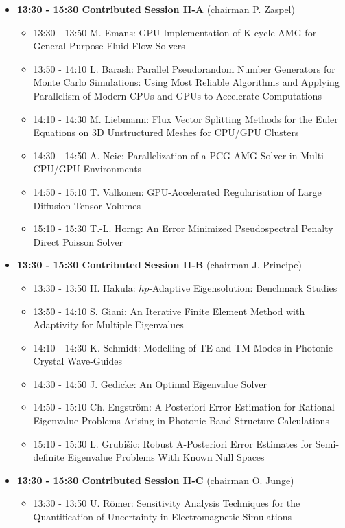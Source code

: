 \documentclass[10pt, A4]{article}%
\begin{document}
\begin{itemize}
  \item {\bf 13:30 - 15:30 Contributed Session II-A} (chairman P. Zaspel) 
  \begin{itemize}
    \item 13:30 - 13:50 M. Emans: GPU Implementation of K-cycle AMG for General Purpose Fluid Flow Solvers
    \item 13:50 - 14:10 L. Barash: Parallel Pseudorandom Number Generators for Monte Carlo Simulations: Using Most Reliable Algorithms and Applying Parallelism of Modern CPUs and GPUs to Accelerate Computations
    \item 14:10 - 14:30 M. Liebmann: Flux Vector Splitting Methods for the Euler Equations on 3D Unstructured Meshes for CPU/GPU Clusters
    \item 14:30 - 14:50 A. Neic: Parallelization of a PCG-AMG Solver in Multi-CPU/GPU Environments
    \item 14:50 - 15:10 T. Valkonen: GPU-Accelerated Regularisation of Large Diffusion Tensor Volumes
    \item 15:10 - 15:30 T.-L. Horng: An Error Minimized Pseudospectral Penalty Direct Poisson Solver
  \end{itemize}
  \item {\bf 13:30 - 15:30 Contributed Session II-B} (chairman J. Principe) 
  \begin{itemize}
    \item 13:30 - 13:50 H. Hakula: $hp$-Adaptive Eigensolution: Benchmark Studies
    \item 13:50 - 14:10 S. Giani: An Iterative Finite Element Method with Adaptivity for Multiple Eigenvalues
    \item 14:10 - 14:30 K. Schmidt: Modelling of TE and TM Modes in Photonic Crystal Wave-Guides
    \item 14:30 - 14:50 J. Gedicke: An Optimal Eigenvalue Solver
    \item 14:50 - 15:10 Ch. Engstr\"{o}m: A Posteriori Error Estimation for Rational Eigenvalue Problems Arising in Photonic Band Structure Calculations
    \item 15:10 - 15:30 L. Grubi\v{s}ic: Robust A-Posteriori Error Estimates for Semi-definite Eigenvalue Problems With Known Null Spaces
  \end{itemize}
\newpage
    \item {\bf 13:30 - 15:30 Contributed Session II-C} (chairman O. Junge) 
  \begin{itemize}
    \item 13:30 - 13:50 U. R\"{o}mer: Sensitivity Analysis Techniques for the Quantification of Uncertainty in Electromagnetic Simulations

\end{itemize}
\end{itemize}
\end{document}
